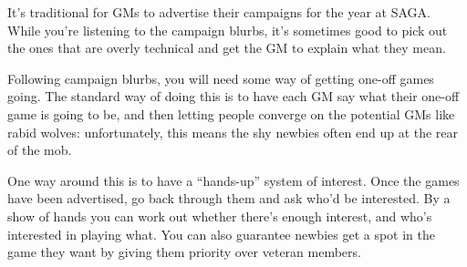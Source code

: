 It's traditional for GMs to advertise their campaigns for the year at SAGA. While you're listening to the campaign blurbs, it's sometimes good to pick out the ones that are overly technical and get the GM to explain what they mean.

Following campaign blurbs, you will need some way of getting one-off games going. The standard way of doing this is to have each GM say what their one-off game is going to be, and then letting people converge on the potential GMs like rabid wolves: unfortunately, this means the shy newbies often end up at the rear of the mob.

One way around this is to have a ``hands-up'' system of interest. Once the games have been advertised, go back through them and ask who'd be interested. By a show of hands you can work out whether there's enough interest, and who's interested in playing what. You can also guarantee newbies get a spot in the game they want by giving them priority over veteran members.